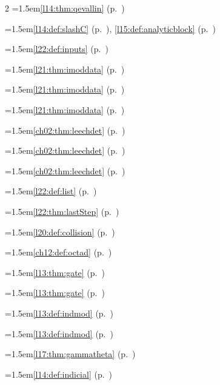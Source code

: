 \begin{multicols}{2}
\hangindent=1.5em\quad \ref{l14:thm:qevallin} (p.~\pageref{l14:thm:qevallin})\par
\hangindent=1.5em\quad \ref{l14:def:slashC} (p.~\pageref{l14:def:slashC}), \ref{l15:def:analyticblock} (p.~\pageref{l15:def:analyticblock})\par
\hangindent=1.5em\quad \ref{l22:def:inputs} (p.~\pageref{l22:def:inputs})\par
\hangindent=1.5em\quad \ref{l21:thm:imoddata} (p.~\pageref{l21:thm:imoddata})\par
\hangindent=1.5em\quad \ref{l21:thm:imoddata} (p.~\pageref{l21:thm:imoddata})\par
\hangindent=1.5em\quad \ref{l21:thm:imoddata} (p.~\pageref{l21:thm:imoddata})\par
\hangindent=1.5em\quad \ref{ch02:thm:leechdet} (p.~\pageref{ch02:thm:leechdet})\par
\hangindent=1.5em\quad \ref{ch02:thm:leechdet} (p.~\pageref{ch02:thm:leechdet})\par
\hangindent=1.5em\quad \ref{ch02:thm:leechdet} (p.~\pageref{ch02:thm:leechdet})\par
\hangindent=1.5em\quad \ref{l22:def:list} (p.~\pageref{l22:def:list})\par
\hangindent=1.5em\quad \ref{l22:thm:lastStep} (p.~\pageref{l22:thm:lastStep})\par
\hangindent=1.5em\quad \ref{l20:def:collision} (p.~\pageref{l20:def:collision})\par
\hangindent=1.5em\quad \ref{ch12:def:octad} (p.~\pageref{ch12:def:octad})\par
\hangindent=1.5em\quad \ref{l13:thm:gate} (p.~\pageref{l13:thm:gate})\par
\hangindent=1.5em\quad \ref{l13:thm:gate} (p.~\pageref{l13:thm:gate})\par
\hangindent=1.5em\quad \ref{l13:def:indmod} (p.~\pageref{l13:def:indmod})\par
\hangindent=1.5em\quad \ref{l13:def:indmod} (p.~\pageref{l13:def:indmod})\par
\hangindent=1.5em\quad \ref{l17:thm:gammatheta} (p.~\pageref{l17:thm:gammatheta})\par
\hangindent=1.5em\quad \ref{l14:def:indicial} (p.~\pageref{l14:def:indicial})\par

\end{multicols}
